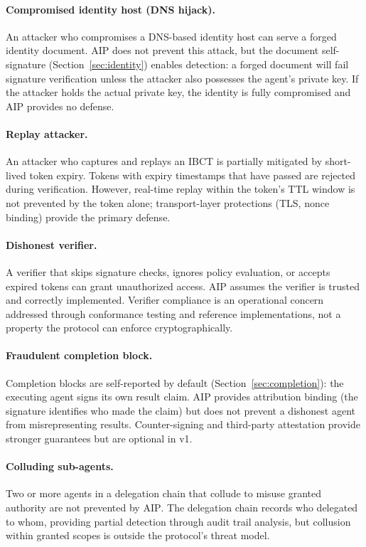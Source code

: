 \documentclass[11pt,a4paper]{article}
\newcommand{\aip}{\textsc{AIP}}
\newcommand{\ibct}{\textsc{IBCT}}
\begin{document}
\paragraph{Compromised identity host (DNS hijack).} An attacker who compromises a DNS-based identity host can serve a forged identity document. \aip{} does not prevent this attack, but the document self-signature (Section~\ref{sec:identity}) enables detection: a forged document will fail signature verification unless the attacker also possesses the agent's private key. If the attacker holds the actual private key, the identity is fully compromised and \aip{} provides no defense.

\paragraph{Replay attacker.} An attacker who captures and replays an \ibct{} is partially mitigated by short-lived token expiry. Tokens with expiry timestamps that have passed are rejected during verification. However, real-time replay within the token's TTL window is not prevented by the token alone; transport-layer protections (TLS, nonce binding) provide the primary defense.

\paragraph{Dishonest verifier.} A verifier that skips signature checks, ignores policy evaluation, or accepts expired tokens can grant unauthorized access. \aip{} assumes the verifier is trusted and correctly implemented. Verifier compliance is an operational concern addressed through conformance testing and reference implementations, not a property the protocol can enforce cryptographically.

\paragraph{Fraudulent completion block.} Completion blocks are self-reported by default (Section~\ref{sec:completion}): the executing agent signs its own result claim. \aip{} provides attribution binding (the signature identifies who made the claim) but does not prevent a dishonest agent from misrepresenting results. Counter-signing and third-party attestation provide stronger guarantees but are optional in v1.

\paragraph{Colluding sub-agents.} Two or more agents in a delegation chain that collude to misuse granted authority are not prevented by \aip{}. The delegation chain records who delegated to whom, providing partial detection through audit trail analysis, but collusion within granted scopes is outside the protocol's threat model.
\end{document}
